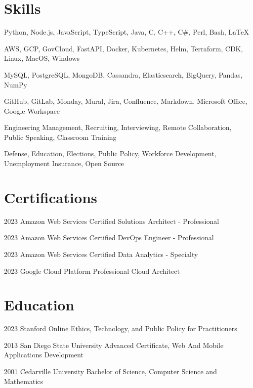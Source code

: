\documentclass{article}
\begin{document}
\section{Skills}

  {Python, Node.js, JavaScript, TypeScript, Java, C, C++, C\#, Perl, Bash, LaTeX}

  {AWS, GCP, GovCloud, FastAPI, Docker, Kubernetes, Helm, Terraform, CDK, Linux, MacOS, Windows}

  {MySQL, PostgreSQL, MongoDB, Cassandra, Elasticsearch, BigQuery, Pandas, NumPy}

  {GitHub, GitLab, Monday, Mural, Jira, Confluence, Markdown, Microsoft Office, Google Workspace}

  {Engineering Management, Recruiting, Interviewing, Remote Collaboration, Public Speaking, Classroom Training}

  {Defense, Education, Elections, Public Policy, Workforce Development, Unemployment Insurance, Open Source}


\section{Certifications}

\education
  {2023}
  {Amazon Web Services}
  {Certified Solutions Architect - Professional}

\education
  {2023}
  {Amazon Web Services}
  {Certified DevOps Engineer - Professional}

\education
  {2023}
  {Amazon Web Services}
  {Certified Data Analytics - Specialty}

\education
  {2023}
  {Google Cloud Platform}
  {Professional Cloud Architect}


\section{Education}

\education
  {2023}
  {Stanford Online}
  {Ethics, Technology, and Public Policy for Practitioners}

\education
  {2013}
  {San Diego State University}
  {Advanced Certificate, Web And Mobile Applications Development}

\education
  {2001}
  {Cedarville University}
  {Bachelor of Science, Computer Science and Mathematics}


\credits
\end{document}
